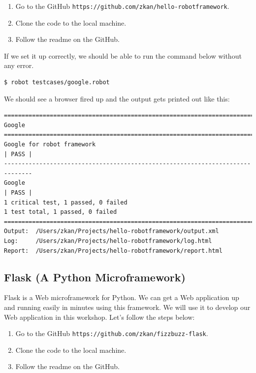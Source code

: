 \documentclass{article}
\begin{document}
\begin{enumerate}
  \item Go to the GitHub {\tt https://github.com/zkan/hello-robotframework}.
  \item Clone the code to the local machine.
  \item Follow the readme on the GitHub.
\end{enumerate}

\noindent If we set it up correctly, we should be able to run the command below
without any error.

\begin{verbatim}
$ robot testcases/google.robot
\end{verbatim}

\noindent We should see a browser fired up and the output gets printed out like
this:

\begin{verbatim}
==============================================================================
Google
==============================================================================
Google for robot framework                                            | PASS |
------------------------------------------------------------------------------
Google                                                                | PASS |
1 critical test, 1 passed, 0 failed
1 test total, 1 passed, 0 failed
==============================================================================
Output:  /Users/zkan/Projects/hello-robotframework/output.xml
Log:     /Users/zkan/Projects/hello-robotframework/log.html
Report:  /Users/zkan/Projects/hello-robotframework/report.html
\end{verbatim}

\subsection*{Flask (A Python Microframework)}

\noindent Flask is a Web microframework for Python. We can get a Web
application up and running easily in minutes using this framework. We will use
it to develop our Web application in this workshop. Let's follow the steps
below:

\begin{enumerate}
  \item Go to the GitHub {\tt https://github.com/zkan/fizzbuzz-flask}.
  \item Clone the code to the local machine.
  \item Follow the readme on the GitHub.
\end{enumerate}
\end{document}
